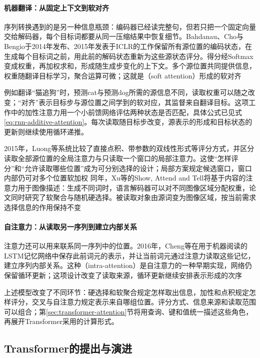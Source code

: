 \paragraph{机器翻译：从固定上下文到软对齐}
序列转换遇到的是另一种信息瓶颈：编码器已经读完整句，但若只把一个固定向量交给解码器，每个目标词都要从同一压缩结果中恢复细节。Bahdanau、Cho与Bengio于2014年发布、2015年发表于ICLR的工作保留所有源位置的编码状态，在生成每个目标词之前，用此前的解码状态重新为这些源状态评分。得分经Softmax变成权重，再加权求和，形成随生成步变化的上下文。多个源位置共同提供信息，权重随翻译目标学习，聚合运算可微；这就是（soft attention）形成的软对齐

例如翻译“猫追狗”时，预测cat与预测dog所需的源信息不同，读取权重可以随之改变；“对齐”表示目标步与源位置之间学到的软对应，其监督来自翻译目标。这项工作中的加性注意力用一个小前馈网络评估两种状态是否匹配，具体公式已见式\eqref{eq:rnn-additive-attention}。每次读取随目标步改变，源表示的形成和目标状态的更新则继续使用循环递推。

2015年，Luong等系统比较了直接点积、带参数的双线性形式等评分方式，并区分读取全部源位置的全局注意力与只读取一个窗口的局部注意力。这使“怎样评分”和“允许读取哪些位置”成为可分别选择的设计；局部方案规定候选窗口，窗口内部仍可对多个位置软加权 同年，Xu等的Show, Attend and Tell将基于内容的注意力用于图像描述：生成不同词时，语言解码器可以对不同图像区域分配权重，论文同时研究了软聚合与随机硬选择。被读取对象由源词变为图像区域，按当前需求选择信息的作用保持不变

\paragraph{自注意力：从读取另一序列到建立内部关系}
注意力还可以用来联系同一序列中的位置。2016年，Cheng等在用于机器阅读的LSTM记忆网络中保存此前词元的表示，并让当前词元通过注意力读取这些记忆，建立序列内部关系。这种（intra-attention）是自注意力的一种早期实现，网络仍保留循环更新；这项设计改变了读取来源，循环更新继续安排表示形成的次序

上述模型改变了不同环节：硬选择和软聚合规定怎样取出信息，加性和点积规定怎样评分，交叉与自注意力规定表示来自哪组位置。评分方式、信息来源和读取范围可以组合；第\ref{sec:transformer-attention}节将用查询、键和值统一描述这些角色，再展开Transformer采用的计算形式。

\subsection{Transformer的提出与演进}
\label{sec:transformer-architecture-history}

